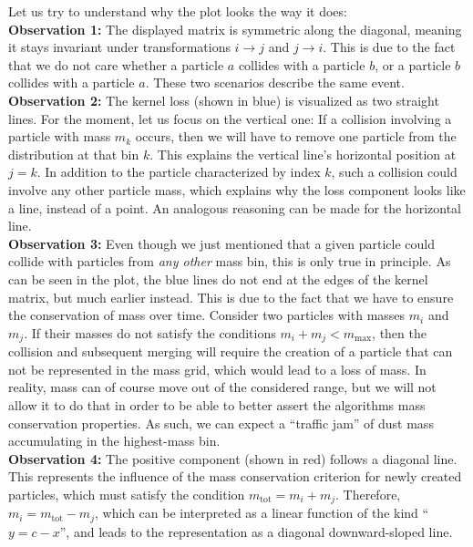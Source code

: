         Let us try to understand why the plot looks the way it does: \\

        \textbf{Observation 1:} The displayed matrix is symmetric along the diagonal, meaning 
        it stays invariant under transformations $i \to j$ and $j \to i$. This is due to the 
        fact that we do not care whether a particle $a$ collides with a particle $b$, or a 
        particle $b$ collides with a particle $a$. These two scenarios describe the same
        event. \\

        \textbf{Observation 2:} The kernel loss (shown in blue) is visualized as two 
        straight lines. For the moment, let us focus on the vertical one: If a collision involving 
        a particle with mass $m_k$ occurs, then we will have to remove one particle from the 
        distribution at that bin $k$. This explains the vertical line's horizontal position at 
        $j = k$. In addition to the particle characterized by index $k$, such a collision could 
        involve any other particle mass, which explains why the loss component looks like a line, 
        instead of a point. An analogous reasoning can be made for the horizontal line. \\

        \textbf{Observation 3:} Even though we just mentioned that a given particle could 
        collide with particles from \textit{any other} mass bin, this is only true in principle. 
        As can be seen in the plot, the blue lines do not end at the edges of the kernel matrix, 
        but much earlier instead. This is due to the fact that we have to ensure the conservation 
        of mass over time. Consider two particles with masses $m_i$ and $m_j$. If their masses 
        do not satisfy the conditions $m_i + m_j < m_\text{max}$, then the collision and subsequent 
        merging will require the creation of a particle that can not be represented in the mass 
        grid, which would lead to a loss of mass. 
        In reality, mass can of course move out of the considered range, but we will not allow it 
        to do that in order to be able to better assert the algorithms mass conservation properties.
        As such, we can expect a ``traffic jam'' of dust mass accumulating in the highest-mass bin.
        \\

        \textbf{Observation 4:} The positive component (shown in red) follows a diagonal line. 
        This represents the influence of the mass conservation criterion for newly created 
        particles, which must satisfy the condition $m_\text{tot} = m_i + m_j$. 
        Therefore, $m_i = m_\text{tot} - m_j$, which can be interpreted as a linear function 
        of the kind ``$y = c - x$'', and leads to the representation as a diagonal
        downward-sloped line. \\

